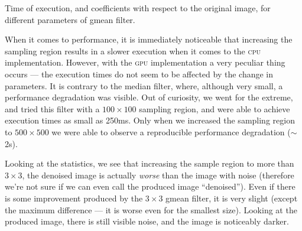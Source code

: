 \documentclass[12pt]{article}
\begin{document}
\begin{table}[H]\centering
    \caption{Time of execution, and coefficients with respect to the original image, for different parameters of gmean filter.}
\end{table}

When it comes to performance, it is immediately noticeable
that increasing the sampling region results in a slower execution when it comes to the \textsc{cpu} implementation.
However, with the \textsc{gpu} implementation a very peculiar thing occurs --- the execution times do not seem to be affected by the change in parameters.
It is contrary to the median filter, where, although very small, a performance degradation was visible.
Out of curiosity, we went for the extreme, and tried this filter with a $100\times100$ sampling region, and were able to achieve execution times as small as 250ms.
Only when we increased the sampling region to $500\times500$ we were able to observe a reproducible performance degradation ($\sim$2s).

Looking at the statistics, we see that increasing the sample region to more than $3\times3$,
the denoised image is actually \emph{worse} than the image with noise
(therefore we're not sure if we can even call the produced image ``denoised'').
Even if there is some improvement produced by the $3\times3$ gmean filter, it is very slight (except the maximum difference --- it is worse even for the smallest size).
Looking at the produced image, there is still visible noise, and the image is noticeably darker.
\end{document}
